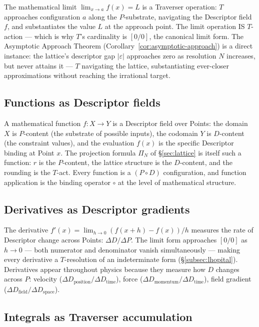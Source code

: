 \documentclass[11pt,a4paper]{article}
\theoremstyle{definition}
\theoremstyle{remark}
\begin{document}
The mathematical limit $\lim_{x \to a} f(x) = L$ is a Traverser operation: $T$ approaches configuration $a$ along the $P$-substrate, navigating the Descriptor field $f$, and substantiates the value $L$ at the approach point. The limit operation IS $T$-action --- which is why $T$'s cardinality is $[0/0]$, the canonical limit form. The Asymptotic Approach Theorem (Corollary~\ref{cor:asymptotic-approach}) is a direct instance: the lattice's descriptor gap $|\varepsilon|$ approaches zero as resolution $N$ increases, but never attains it --- $T$ navigating the lattice, substantiating ever-closer approximations without reaching the irrational target.

\subsection{Functions as Descriptor fields}\label{subsec:functions-PD}

A mathematical function $f: X \to Y$ is a Descriptor field over Points: the domain $X$ is $P$-content (the substrate of possible inputs), the codomain $Y$ is $D$-content (the constraint values), and the evaluation $f(x)$ is the specific Descriptor binding at Point $x$. The projection formula $\Pi_{N}$ of \S\ref{sec:lattice} is itself such a function: $r$ is the $P$-content, the lattice structure is the $D$-content, and the rounding is the $T$-act. Every function is a $(P \circ D)$ configuration, and function application is the binding operator $\circ$ at the level of mathematical structure.

\subsection{Derivatives as Descriptor gradients}\label{subsec:derivatives-DeltaD}

The derivative $f'(x) = \lim_{h \to 0} (f(x+h) - f(x))/h$ measures the rate of Descriptor change across Points: $\Delta D / \Delta P$. The limit form approaches $[0/0]$ as $h \to 0$ --- both numerator and denominator vanish simultaneously --- making every derivative a $T$-resolution of an indeterminate form (\S\ref{subsec:lhopital}). Derivatives appear throughout physics because they measure how $D$ changes across $P$: velocity ($\Delta D_{\text{position}} / \Delta D_{\text{time}}$), force ($\Delta D_{\text{momentum}} / \Delta D_{\text{time}}$), field gradient ($\Delta D_{\text{field}} / \Delta D_{\text{space}}$).

\subsection{Integrals as Traverser accumulation}\label{subsec:integrals-accumulation}
\end{document}
